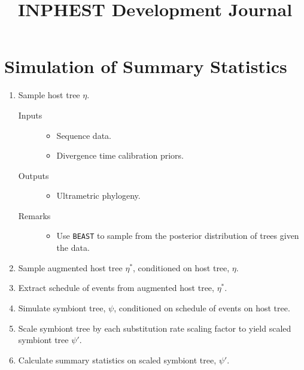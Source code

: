 \documentclass[11pt]{article}
\newcommand{\hostTree}{\eta}
\newcommand{\augmentedHostTree}{\hostTree^{*}}
\newcommand{\symbiontTree}{\psi}
\newcommand{\scaledSymbiontTree}{\psi\prime}
\begin{document}
\title{INPHEST Development Journal}
\maketitle

\section{Simulation of Summary Statistics}
\label{summary-statistics-simulation-workflow} %

\begin{enumerate}
    \item Sample host tree $\hostTree$.
    \begin{description}
        \item[Inputs]
            \begin{itemize}
                \item Sequence data.
                \item Divergence time calibration priors.
            \end{itemize}
        \item[Outputs]
            \begin{itemize}
                \item Ultrametric phylogeny.
            \end{itemize}
        \item[Remarks]
            \begin{itemize}
                \item Use \texttt{BEAST} to sample from the posterior distribution of trees given the data.
            \end{itemize}
    \end{description}

    \item Sample augmented host tree $\augmentedHostTree$, conditioned on host tree, $\hostTree$.
    \item Extract schedule of events from augmented host tree, $\augmentedHostTree$.
    \item Simulate symbiont tree, $\symbiontTree$, conditioned on schedule of events on host tree.
    \item Scale symbiont tree by each substitution rate scaling factor to yield scaled symbiont tree $\scaledSymbiontTree$.
    \item Calculate summary statistics on scaled symbiont tree, $\scaledSymbiontTree$.
\end{enumerate}
\end{document}
